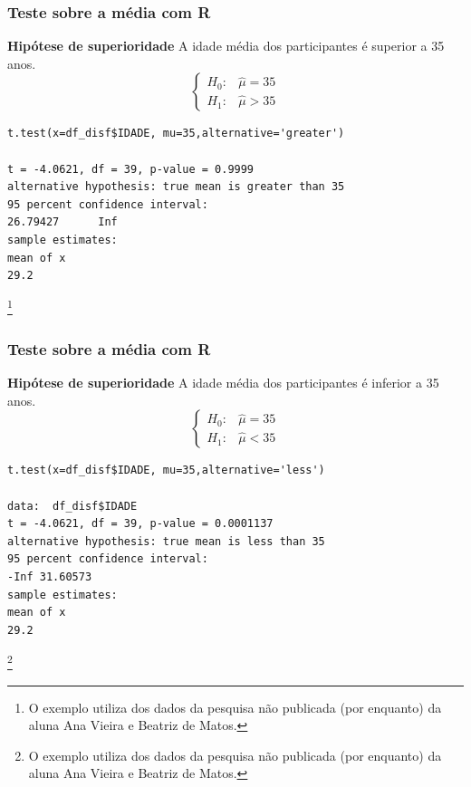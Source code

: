 \documentclass[graphics,14pt]{beamer}
\newcommand{\lfr}[1]{\let\thefootnote\relax\footnote{\hspace{0.6cm}\vspace{1.25cm} #1}}
\begin{document}
\begin{frame}[t,fragile=singleslide]
\frametitle{Teste sobre a média com R}
\textbf{Hipótese de superioridade}
A idade média dos participantes é superior a 35 anos.
\begin{equation*}
\left\{ \begin{array}{cl}
H_0: & \hat{\mu} = 35 \\
H_1: & \hat{\mu} > 35
\end{array}\right.
\end{equation*}

\begin{lstlisting}
t.test(x=df_disf$IDADE, mu=35,alternative='greater')

t = -4.0621, df = 39, p-value = 0.9999
alternative hypothesis: true mean is greater than 35
95 percent confidence interval:
26.79427      Inf
sample estimates:
mean of x 
29.2 
\end{lstlisting}

\lfr{O exemplo utiliza dos dados da pesquisa não publicada (por enquanto) da aluna Ana Vieira e Beatriz de Matos.}

\end{frame}
\begin{frame}[t,fragile=singleslide]
\frametitle{Teste sobre a média com R}
\textbf{Hipótese de superioridade}
A idade média dos participantes é inferior a 35 anos.
\begin{equation*}
\left\{ \begin{array}{cl}
H_0: & \hat{\mu} = 35 \\
H_1: & \hat{\mu} < 35
\end{array}\right.
\end{equation*}

\begin{lstlisting}
t.test(x=df_disf$IDADE, mu=35,alternative='less')

data:  df_disf$IDADE
t = -4.0621, df = 39, p-value = 0.0001137
alternative hypothesis: true mean is less than 35
95 percent confidence interval:
-Inf 31.60573
sample estimates:
mean of x 
29.2 
\end{lstlisting}

\lfr{O exemplo utiliza dos dados da pesquisa não publicada (por enquanto) da aluna Ana Vieira e Beatriz de Matos.}

\end{frame}
\end{document}
